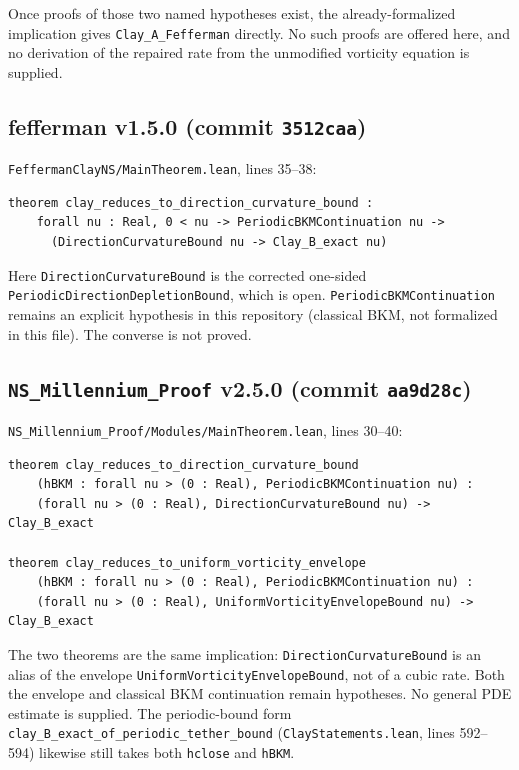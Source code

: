 \documentclass[11pt]{article}
\theoremstyle{plain}
\theoremstyle{definition}
\theoremstyle{remark}
\begin{document}
Once proofs of those two named hypotheses exist, the already-formalized implication gives \texttt{Clay\_A\_Fefferman} directly. No such proofs are offered here, and no derivation of the repaired rate from the unmodified vorticity equation is supplied.

\subsection{fefferman v1.5.0 (commit \texttt{3512caa})}

\texttt{FeffermanClayNS/\hspace{0pt}MainTheorem.\hspace{0pt}lean}, lines 35--38:
\begin{lstlisting}
theorem clay_reduces_to_direction_curvature_bound :
    forall nu : Real, 0 < nu -> PeriodicBKMContinuation nu ->
      (DirectionCurvatureBound nu -> Clay_B_exact nu)
\end{lstlisting}
Here \texttt{DirectionCurvatureBound} is the corrected one-sided \texttt{PeriodicDirectionDepletionBound}, which is open. \texttt{PeriodicBKMContinuation} remains an explicit hypothesis in this repository (classical BKM, not formalized in this file). The converse is not proved.

\subsection[NS\_Millennium\_Proof v2.5.0 (commit aa9d28c)]{\texttt{NS\_Millennium\_Proof} v2.5.0 (commit \texttt{aa9d28c})}

\texttt{NS\_\hspace{0pt}Millennium\_\hspace{0pt}Proof/\hspace{0pt}Modules/\hspace{0pt}MainTheorem.\hspace{0pt}lean}, lines 30--40:
\begin{lstlisting}
theorem clay_reduces_to_direction_curvature_bound
    (hBKM : forall nu > (0 : Real), PeriodicBKMContinuation nu) :
    (forall nu > (0 : Real), DirectionCurvatureBound nu) -> Clay_B_exact

theorem clay_reduces_to_uniform_vorticity_envelope
    (hBKM : forall nu > (0 : Real), PeriodicBKMContinuation nu) :
    (forall nu > (0 : Real), UniformVorticityEnvelopeBound nu) -> Clay_B_exact
\end{lstlisting}
The two theorems are the same implication: \texttt{DirectionCurvatureBound} is an alias of the envelope \texttt{UniformVorticityEnvelopeBound}, not of a cubic rate. Both the envelope and classical BKM continuation remain hypotheses. No general PDE estimate is supplied. The periodic-bound form \texttt{clay\_\hspace{0pt}B\_\hspace{0pt}exact\_\hspace{0pt}of\_\hspace{0pt}periodic\_\hspace{0pt}tether\_\hspace{0pt}bound} (\texttt{ClayStatements.\hspace{0pt}lean}, lines 592--594) likewise still takes both \texttt{hclose} and \texttt{hBKM}.
\end{document}
